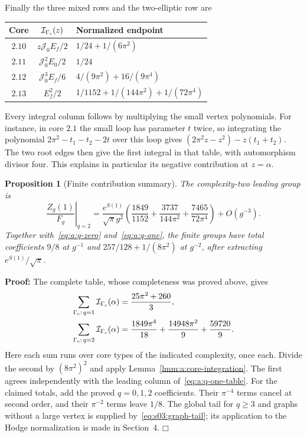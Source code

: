 \documentclass[a4paper,10pt]{article}
\numberwithin{equation}{section}
\theoremstyle{paperplain}
\newtheorem{prp}[thm]{Proposition}
\theoremstyle{paperremark}
\theoremstyle{paperplain}
\newenvironment{prf}{\noindent \textbf{Proof: }}{\hfill $\mdlgwhtsquare$\par\addvspace{0.5\baselineskip}}
\begin{document}
Finally the three mixed rows and the two-elliptic row are
\begin{center}
\begin{tabular}{ccl}
 Core&$\mathcal I_{\Gamma_{\rm c}}(z)$&Normalized endpoint\\[1mm]\hline
 \noalign{\smallskip}
 $2.10$&$z\mathcal J_0E_f/2$&$1/24+1/(6\pi^2)$\\[1mm]
 $2.11$&$\mathcal J_0^2E_0/2$&$1/24$\\[1mm]
 $2.12$&$\mathcal J_0^3E_f/6$&$4/(9\pi^2)+16/(9\pi^4)$\\[1mm]
 $2.13$&$E_f^2/2$&$1/1152+1/(144\pi^2)+1/(72\pi^4)$
\end{tabular}
\end{center}

Every integral column follows by multiplying the small vertex
polynomials. For instance, in core $2.1$ the small loop has parameter
$t$ twice, so integrating the polynomial
$2\pi^2-t_1-t_2-2t$ over this loop gives
$(2\pi^2z-z^2)-z(t_1+t_2)$. The two root edges then give the first
integral in that table, with automorphism divisor four. This explains
in particular its negative contribution at $z=\alpha$.

\begin{prp}[Finite contribution summary]\label{prp:a:finite-summary}
The complexity-two leading group is
\begin{equation}\label{eq:a:q-two}
 \left.\frac{Z_g(1)}{F_g}\right|_{q=2}
 =\frac{e^{S(1)}}{\sqrt\pi g^2}
 \left(\frac{1849}{1152}+\frac{3737}{144\pi^2}
                             +\frac{7465}{72\pi^4}\right)+O(g^{-3}).
\end{equation}
Together with~\eqref{eq:a:q-zero} and~\eqref{eq:a:q-one}, the finite
groups have total coefficients $9/8$ at $g^{-1}$ and
$257/128+1/(8\pi^2)$ at $g^{-2}$, after extracting
$e^{S(1)}/\sqrt\pi$.
\end{prp}
\begin{prf}
The complete table, whose completeness was proved above, gives
\begin{align*}
 \sum_{\Gamma_{\rm c}:\,q=1}\mathcal I_{\Gamma_{\rm c}}(\alpha)
                 &=\frac{25\pi^2+260}{3},\\
 \sum_{\Gamma_{\rm c}:\,q=2}\mathcal I_{\Gamma_{\rm c}}(\alpha)
                 &=\frac{1849\pi^4}{18}
                         +\frac{14948\pi^2}{9}+\frac{59720}{9}.
\end{align*}
Here each sum runs over core types of the indicated complexity, once
each. Divide the second by $(8\pi^2)^2$ and apply
Lemma~\ref{lmm:a:core-integration}. The first agrees independently
with the leading column of~\eqref{eq:a:q-one-table}.
For the claimed totals, add the proved $q=0,1,2$ coefficients. Their
$\pi^{-4}$ terms cancel at second order, and their $\pi^{-2}$ terms
leave $1/8$. The global tail for $q\geq3$ and graphs without a large
vertex is supplied by~\eqref{eq:s03:graph-tail}; its application to
the Hodge normalization is made in Section~4.
\end{prf}
\end{document}
